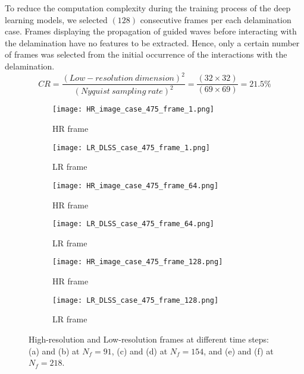 To reduce the computation complexity during the training process of the deep learning models, we selected \((128)\) consecutive frames per each delamination case.
Frames displaying the propagation of guided waves before interacting with the delamination have no features to be extracted. 
Hence, only a certain number of frames was selected from the initial occurrence of the interactions with the delamination.
\begin{equation}
	CR = \frac{(Low-resolution\ dimension)^2}{(Nyquist\ sampling\ rate)^2} = \frac{(32\times32)}{(69\times69)}=21.5\%
	\label{CR}
\end{equation}
\begin{figure} [!ht]
	\centering
	\begin{subfigure}[b]{.48\textwidth}
		\centering
	\texttt{[image: HR\_image\_case\_475\_frame\_1.png]}
		\caption{HR frame}
		\label{fig:SR_1}
	\end{subfigure}
	\hfill
	\begin{subfigure}[b]{.48\textwidth}
		\centering
		\texttt{[image: LR\_DLSS\_case\_475\_frame\_1.png]}
		\caption{LR frame}
		\label{fig:LR_1}	
	\end{subfigure}
	\hfill
		\begin{subfigure}[b]{.48\textwidth}
		\centering
		\texttt{[image: HR\_image\_case\_475\_frame\_64.png]}
		\caption{HR frame}
		\label{fig:SR_2}
	\end{subfigure}
	\hfill
	\begin{subfigure}[b]{.48\textwidth}
		\centering
		\texttt{[image: LR\_DLSS\_case\_475\_frame\_64.png]}
		\caption{LR frame}
		\label{fig:LR_2}	
	\end{subfigure}
	\hfill
		\begin{subfigure}[b]{.48\textwidth}
		\centering
		\texttt{[image: HR\_image\_case\_475\_frame\_128.png]}
		\caption{HR frame}
		\label{fig:SR_3}
	\end{subfigure}
	\hfill
	\begin{subfigure}[b]{.48\textwidth}
		\centering
		\texttt{[image: LR\_DLSS\_case\_475\_frame\_128.png]}
		\caption{LR frame}
		\label{fig:LR_3}	
	\end{subfigure}
	\caption{High-resolution and Low-resolution frames at different time steps: (a) and (b) at $N_f=91$, (c) and (d) at $N_f=154$, and (e) and (f) at $N_f=218$.}
	\label{fig:SR_LR}
\end{figure}
\newpage